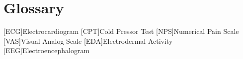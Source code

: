 \chapter{Glossary}

\footnotesize
\SingleSpacing

\begin{multicols}{2}
\begin{acronym}[AAAAAA]

	[ECG]{Electrocardiogram}
	[CPT]{Cold Pressor Test}
	[NPS]{Numerical Pain Scale}
	[VAS]{Visual Analog Scale}
	[EDA]{Electrodermal Activity}
	[EEG]{Electroencephalogram}

\end{acronym}
\end{multicols}

